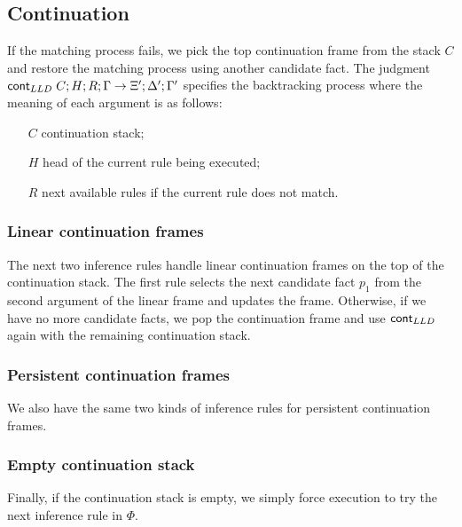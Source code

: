 

\subsection{Continuation}\label{sec:lld_match_cont}

If the matching process fails, we pick the top continuation frame from the stack
$C$ and restore the matching process using another candidate fact. The judgment
\mbox{$\mathsf{cont}_{LLD} \; C; H; R; \Gamma \rightarrow \Xi'; \Delta'; \Gamma'$} specifies the
backtracking process where the meaning of each argument is as follows:

\begin{enumerate}
   \item[$C$] continuation stack;
   \item[$H$] head of the current rule being executed;

   \item[$R$] next available rules if the current rule does not match.

\end{enumerate}

\subsubsection{Linear continuation frames}

The next two inference rules handle linear continuation frames on the top of the
continuation stack. The first rule selects the next candidate fact $p_1$ from the
second argument of the linear frame and updates the frame. Otherwise, if we have
no more candidate facts, we pop the continuation frame and use $\mathsf{cont}_{LLD} \;$again with
the remaining continuation stack.



\subsubsection{Persistent continuation frames}

We also have the same two kinds of inference rules for persistent continuation
frames.



\subsubsection{Empty continuation stack}

Finally, if the continuation stack is empty, we simply force execution to try
the next inference rule in $\Phi$.

